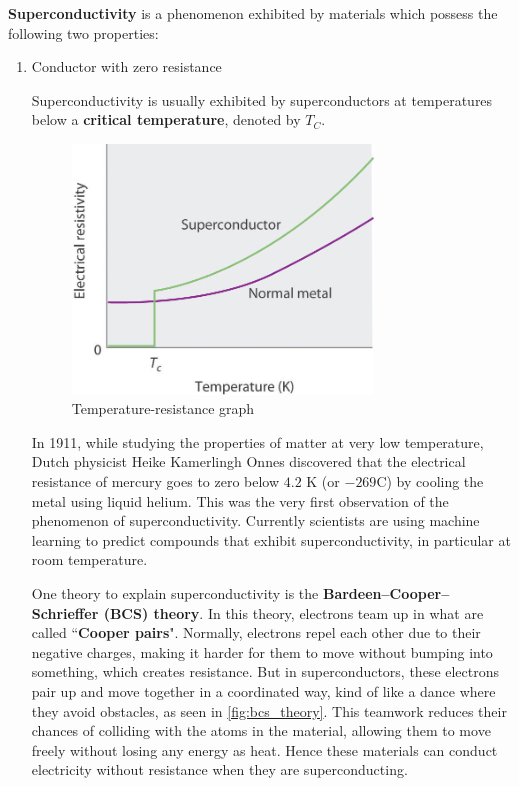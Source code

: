 \documentclass[12pt,a4paper]{article}
\begin{document}
\textbf{Superconductivity} is a phenomenon exhibited by materials which possess the following two properties:
\begin{enumerate}
\item Conductor with zero resistance

Superconductivity is usually exhibited by superconductors at temperatures below a \textbf{critical temperature}, denoted by $T_C$. 

\begin{figure}[H]
    \centering
    \includegraphics[width=8cm]{images/superconductivity_temp.jpg}
    \caption{Temperature-resistance graph}
    \label{fig:temp-resis_graph}
\end{figure}

In 1911, while studying the properties of matter at very low temperature, Dutch physicist Heike Kamerlingh Onnes discovered that the electrical resistance of mercury goes to zero below $4.2$ K (or $-269$\degree C) by cooling the metal using liquid helium. This was the very first observation of the phenomenon of superconductivity. Currently scientists are using machine learning to predict compounds that exhibit superconductivity, in particular at room temperature.

One theory to explain superconductivity is the \textbf{Bardeen--Cooper--Schrieffer (BCS) theory}. In this theory, electrons team up in what are called ``\textbf{Cooper pairs}". Normally, electrons repel each other due to their negative charges, making it harder for them to move without bumping into something, which creates resistance. But in superconductors, these electrons pair up and move together in a coordinated way, kind of like a dance where they avoid obstacles, as seen in \cref{fig:bcs_theory}. This teamwork reduces their chances of colliding with the atoms in the material, allowing them to move freely without losing any energy as heat. Hence these materials can conduct electricity without resistance when they are superconducting.


\end{enumerate}
\end{document}

